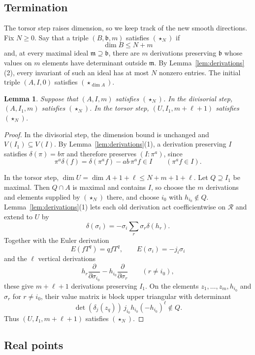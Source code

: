 \documentclass[11pt]{amsart}
\numberwithin{equation}{section}
\newtheorem{lemma}[theorem]{Lemma}
\theoremstyle{definition}
\newcommand{\fm}{\mathfrak{m}}
\newcommand{\cR}{\mathcal{R}}
\newcommand{\fb}{\mathfrak{b}}
\begin{document}
\subsection{Termination}
The torsor step raises dimension, so we keep track of the new smooth directions. Fix $N\ge0$. Say that a triple $(B,\fb,m)$ satisfies $(\star_N)$ if
\[
  \dim B\le N+m
\]
and, at every maximal ideal $\fm\supseteq\fb$, there are $m$ derivations preserving $\fb$ whose values on $m$ elements have determinant outside $\fm$. By Lemma~\ref{lem:derivations}(2), every invariant of such an ideal has at most $N$ nonzero entries. The initial triple $(A,I,0)$ satisfies $(\star_{\dim A})$.

\begin{lemma}\label{lem:length-control}
Suppose that $(A,I,m)$ satisfies $(\star_N)$. In the divisorial step, $(A,I_1,m)$ satisfies $(\star_N)$. In the torsor step, $(U,I_1,m+\ell+1)$ satisfies $(\star_N)$.
\end{lemma}

\begin{proof}
In the divisorial step, the dimension bound is unchanged and $V(I_1)\subseteq V(I)$. By Lemma~\ref{lem:derivations}(1), a derivation preserving $I$ satisfies $\delta(\pi)=b\pi$ and therefore preserves $(I:\pi^a)$, since
\[
  \pi^a\delta(f)=\delta(\pi^af)-ab\,\pi^af\in I
  \qquad(\pi^af\in I).
\]

In the torsor step, $\dim U=\dim A+1+\ell\le N+m+1+\ell$. Let $Q\supseteq I_1$ be maximal. Then $Q\cap A$ is maximal and contains $I$, so choose the $m$ derivations and elements supplied by $(\star_N)$ there, and choose $i_0$ with $h_{i_0}\notin Q$. Lemma~\ref{lem:derivations}(1) lets each old derivation act coefficientwise on $\cR$ and extend to $U$ by
\[
  \delta(\sigma_i)=-\sigma_i\sum_r\sigma_r\delta(h_r).
\]
Together with the Euler derivation
\[
  E(fT^q)=qfT^q,\qquad E(\sigma_i)=-j_i\sigma_i
\]
and the $\ell$ vertical derivations
\[
  h_r\frac{\partial}{\partial\sigma_{i_0}}
  -h_{i_0}\frac{\partial}{\partial\sigma_r}
  \qquad(r\ne i_0),
\]
these give $m+\ell+1$ derivations preserving $I_1$. On the elements $z_1,\ldots,z_m,h_{i_0}$ and $\sigma_r$ for $r\ne i_0$, their value matrix is block upper triangular with determinant
\[
  \det(\delta_j(z_q))\,j_{i_0}h_{i_0}(-h_{i_0})^\ell\notin Q.
\]
Thus $(U,I_1,m+\ell+1)$ satisfies $(\star_N)$.
\end{proof}

\subsection{Real points}\label{subsec:principalization-real-points}
\end{document}

